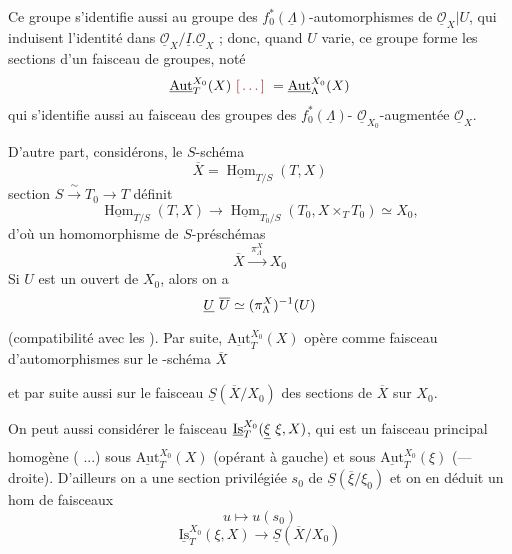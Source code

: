 \documentclass[11pt,a4paper]{article}
\begin{document}

Ce groupe s'identifie aussi au groupe des
$f_{0}^{*}(\underline{\Lambda})$-automorphismes de
$\underline{\mathcal{O}}_{X} | U$, qui induisent l'identité dans
$\underline{\mathcal{O}}_{X} / \underline{I} . \underline{\mathcal{O}}_{X}$ ;
donc, quand $U$ varie, ce groupe forme les sections d'un faisceau de
groupes, noté
\[
  \underline{\mathrm{Aut}}^{X_0}_{T}(X) \ \ill{} \ =
  \underline{\mathrm{Aut}}^{X_0}_{\Lambda}(X)
\]
qui s'identifie aussi au faisceau des groupes des  $f_{0}^{*}(\underline{\Lambda})$-
$\underline{\mathcal{O}}_{X_0}$-augmentée $\underline{\mathcal{O}}_{X}$.

D'autre part, considérons, \struck{\ill{}} le $S$-schéma
\[
  \overline{X} = \underline{\operatorname{Hom}}_{T/S}(T, X)
\]
 section $S \xrightarrow{\;\sim\;} T_{0} \to T$
définit
\[
  \underline{\operatorname{Hom}}_{T/S}(T, X) \longrightarrow
  \underline{\operatorname{Hom}}_{T_0/S}(T_{0}, X \times_{T} T_{0})
  \simeq X_{0},
\]
d'où un homomorphisme de $S$-préschémas
\[
  \overline{X} \xrightarrow{\;\pi^{X}_{\Lambda}\;} X_{0}
\]
Si $U$ est un ouvert de $X_{0}$, alors on a
\[
  \struck{U}\ \overline{U} \simeq (\pi^{X}_{\Lambda})^{-1}(U)
\]
(compatibilité avec les ). Par suite,
$\underline{\mathrm{Aut}}^{X_0}_{T}(X)$ opère comme faisceau
d'automorphismes sur le -schéma $\overline{X}$

et par suite aussi \struck{\ill{}} sur le faisceau
$\boxed{\underline{S}(\overline{X}/X_{0})}$ des \struck{\ill{}} sections
de $\overline{X}$ sur $X_{0}$.

On peut aussi considérer le faisceau
$\underline{\mathrm{Is}}^{X_0}_{T}(\struck{\xi}\ \xi, X)$, qui est un
faisceau principal homogène ( ...) sous
$\underline{\mathrm{Aut}}^{X_0}_{T}(X)$ (opérant à gauche) et sous
$\underline{\mathrm{Aut}}^{X_0}_{T}(\xi)$ (--- droite). D'ailleurs on a
une section privilégiée $s_{0}$ de $\underline{S}(\overline{\xi}/\xi_{0})$
et on en déduit un hom de faisceaux
\[
  u \longmapsto u(s_{0})
\]
\[
  \underline{\mathrm{Is}}^{X_0}_{T}(\xi, X) \longrightarrow
  \underline{S}(\overline{X}/X_{0})
\]
\end{document}
